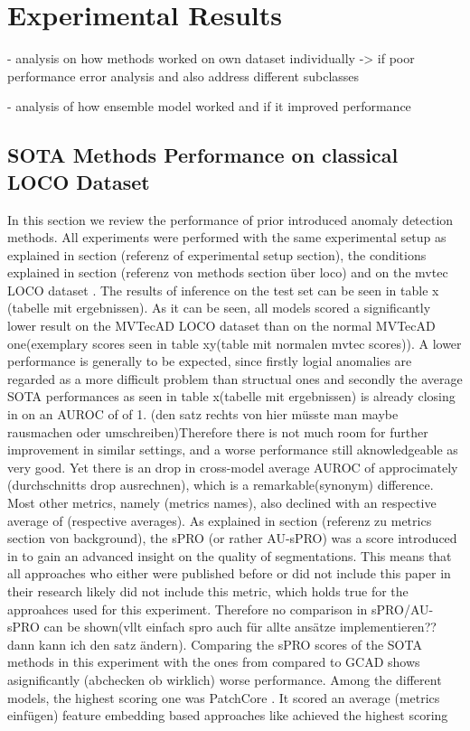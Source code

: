 \chapter{Experimental Results}
\label{chap:experiments}



- analysis on how methods worked on own dataset individually
-> if poor performance error analysis and also address different subclasses

- analysis of how ensemble model worked and if it improved performance



\section{SOTA Methods Performance on classical LOCO Dataset}
\label{sec:locoresultssota}
In this section we review the performance of prior introduced anomaly detection methods. All experiments were performed with the same 
experimental setup as explained in section (referenz of experimental setup section), the conditions explained in section (referenz von methods section über loco) 
and on the mvtec LOCO dataset \cite{LOCODentsAndScratchesBergmann2022}. 
The results of inference on the test set can be seen in table x (tabelle mit ergebnissen). As it can be seen, all models scored a significantly 
lower result on the MVTecAD LOCO dataset than on the normal MVTecAD one(exemplary scores seen in table xy(table mit normalen mvtec scores)). 
A lower performance is generally to be expected, since firstly logial anomalies are regarded as a more difficult problem than structual 
ones and secondly the average SOTA performances as seen in table x(tabelle mit ergebnissen) is already closing in on an AUROC of of 1. 
(den satz rechts von hier müsste man maybe rausmachen oder umschreiben)Therefore there is not much room for further improvement in similar settings, and a worse performance still aknowledgeable as very good. 
Yet there is an drop in cross-model average AUROC of approcimately (durchschnitts drop ausrechnen), which is a remarkable(synonym) difference. 
Most other metrics, namely (metrics names), also declined with an respective average of (respective averages). As explained in section 
(referenz zu metrics section von background), the sPRO (or rather AU-sPRO) was a score introduced in \cite{LOCODentsAndScratchesBergmann2022} to gain an 
advanced insight on the quality of segmentations. This means that all approaches who either were published before or did not include this 
paper in their research likely did not include this metric, which holds true for the approahces used for this experiment. Therefore no comparison 
in sPRO/AU-sPRO can be shown(vllt einfach spro auch für allte ansätze implementieren?? dann kann ich den satz ändern). Comparing the sPRO 
scores of the SOTA methods in this experiment with the ones from compared to GCAD \cite{LOCODentsAndScratchesBergmann2022} shows asignificantly 
(abchecken ob wirklich) worse performance.
Among the different models, the highest scoring one was PatchCore \cite{patchCore2022}. It scored an average (metrics einfügen) feature embedding based approaches like  
achieved the highest scoring


